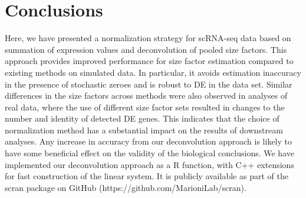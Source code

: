 \documentclass{bmcart}
\begin{document}
\section*{Conclusions}
Here, we have presented a normalization strategy for scRNA-seq data based on summation of expression values and deconvolution of pooled size factors.
This approach provides improved performance for size factor estimation compared to existing methods on simulated data.
In particular, it avoids estimation inaccuracy in the presence of stochastic zeroes and is robust to DE in the data set.
Similar differences in the size factors across methods were also observed in analyses of real data,
    where the use of different size factor sets resulted in changes to the number and identity of detected DE genes.
This indicates that the choice of normalization method has a substantial impact on the results of downstream analyses.
Any increase in accuracy from our deconvolution approach is likely to have some beneficial effect on the validity of the biological conclusions.
We have implemented our deconvolution approach as a R function, with C++ extensions for fast construction of the linear system.
It is publicly available as part of the scran package on GitHub ({https://github.com/MarioniLab/scran}).

\end{document}
